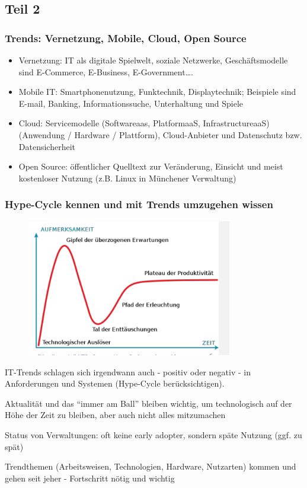 \subsection{Teil 2}
\subsubsection{Trends: Vernetzung, Mobile, Cloud, Open Source}
\begin{itemize}
  \item Vernetzung: IT als digitale Spielwelt, soziale Netzwerke, Geschäftsmodelle sind E-Commerce, E-Business, E-Government\ldots.
  \item Mobile IT: Smartphonenutzung, Funktechnik, Displaytechnik; Beispiele sind E-mail, Banking, Informationssuche, Unterhaltung und Spiele
  \item Cloud: Servicemodelle (Softwareaas, PlatformaaS, InfrastructureaaS)(Anwendung / Hardware / Plattform), Cloud-Anbieter und Datenschutz bzw. Datensicherheit
  \item Open Source: öffentlicher Quelltext zur Veränderung, Einsicht und meist kostenloser Nutzung (z.B. Linux in Münchener Verwaltung)
\end{itemize}

\subsubsection{Hype-Cycle kennen und mit Trends umzugehen wissen}
\begin{figure}[htp]
\begin{center}
\includegraphics[width=0.8\textwidth]{assets/HypeCycle.PNG}
\end{center}
\end{figure}

IT-Trends schlagen sich irgendwann auch - positiv oder negativ - in Anforderungen und Systemen (Hype-Cycle berücksichtigen).
\par
Aktualität und das “immer am Ball” bleiben wichtig, um technologisch auf der Höhe der Zeit zu bleiben, aber auch nicht alles mitzumachen
\par Status von Verwaltungen: oft keine early adopter, sondern späte Nutzung (ggf. zu spät)
\par Trendthemen (Arbeitsweisen, Technologien, Hardware, Nutzarten) kommen und gehen seit jeher - Fortschritt nötig und wichtig

